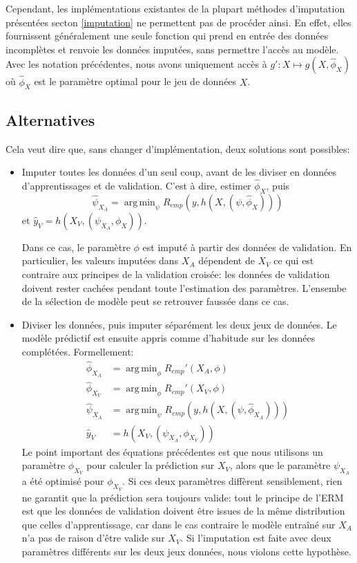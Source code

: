\documentclass[12pt, a4paper]{article}
\DeclareMathOperator*{\argmin}{arg\,min}
\begin{document}
Cependant, les implémentations existantes de la plupart méthodes d'imputation présentées secton \ref{imputation} ne permettent pas de procéder ainsi. En effet, elles fournissent généralement une seule fonction qui prend en entrée des données incomplètes et renvoie les données imputées, sans permettre l'accès au modèle. Avec les notation précédentes, nous avons uniquement accès à $g': X \mapsto g(X, \hat{\phi}_X)$ où $\hat{\phi}_X$ est le paramètre optimal pour le jeu de données $X$. 

\subsection{Alternatives}
Cela veut dire que, sans changer d'implémentation, deux solutions sont possibles:
\begin{itemize}
\item Imputer toutes les données d'un seul coup, avant de les diviser en données d'apprentissages et de validation. C'est à dire, estimer $\hat{\phi}_X$, puis 
$$\hat{\psi}_{X_A} = \argmin_{\psi} R_{emp}(y, h(X, (\psi, \hat{\phi}_X)))$$
 et $\hat{y}_V = h(X_V, (\psi_{X_A}, \phi_X))$. 

Dans ce cas, le paramètre $\phi$ est imputé à partir des données de validation. En particulier, les valeurs imputées dans $X_A$ dépendent de $X_V$ ce qui est contraire aux principes de la validation croisée: les données de validation doivent rester cachées pendant toute l'estimation des paramètres. L'ensembe de la sélection de modèle peut se retrouver faussée dans ce cas.

\item Diviser les données, puis imputer séparément les deux jeux de données. Le modèle prédictif est ensuite appris comme d'habitude sur les données complétées. Formellement:
\begin{align*}
\hat{\phi}_{X_A} &= \argmin_{\phi} R_{emp}'(X_A, \phi) \\
\hat{\phi}_{X_V} &= \argmin_{\phi} R_{emp}'(X_V, \phi) \\
\hat{\psi}_{X_A} &= \argmin_{\psi} R_{emp}(y, h(X, (\psi, \hat{\phi}_{X_A}))) \\
\hat{y}_V &= h(X_V, (\psi_{X_A}, \phi_{X_V}))
\end{align*}
Le point important des équations précédentes est que nous utilisons un paramètre $\phi_{X_V}$ pour calculer la prédiction sur $X_V$, alors que le paramètre  $\psi_{X_A}$ a été optimisé pour $\phi_{X_V}$. Si ces deux paramètres diffèrent sensiblement, rien ne garantit que la prédiction sera toujours valide: tout le principe de l'ERM est que les données de validation doivent être issues de la même distribution que celles d'apprentissage, car dans le cas contraire le modèle entraîné sur $X_A$ n'a pas de raison d'être valide sur $X_V$. Si l'imputation est faite avec deux paramètres différents sur les deux jeux données, nous violons cette hypothèse.
\end{itemize}
\end{document}
